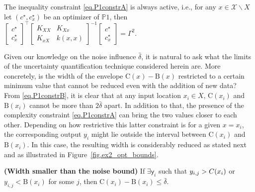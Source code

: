 \begin{proposition} 
	\label{prop.complex_constraint_always_active}
	The inequality constraint \eqref{eq.P1constrA} is always active, i.e., for any $x \in \mathcal{X} \backslash X $ let $(c^\star,c_x^\star)$ be an optimizer of $\mathds{P}1$, then $\begin{bmatrix}
		c ^\star\\
		c_x^\star
	\end{bmatrix}^\top 
	\begin{bmatrix}
		K_{XX} & K_{Xx} \\
		K_{xX} & k(x,x)
	\end{bmatrix}^{-1} 
	\begin{bmatrix}
		c^\star \\
		c_x^\star
	\end{bmatrix} = \Gamma^2 $. 
\end{proposition}

Given our knowledge on the noise influence $\bar \delta$, it is natural to ask what the limits of the uncertainty quantification technique considered herein are. More concretely, is the width of the envelope $\text{C}(x) - \text{B}(x)$ restricted to a certain minimum value that cannot be reduced even with the addition of new data? From \eqref{eq.P1constrB}, it is clear that at any input location $x_i \in X$, $\text{C}(x_i)$ and $\text{B}(x_i)$ cannot be more than $2\bar \delta$ apart. In addition to that, the presence of the complexity constraint \eqref{eq.P1constrA} can bring the two values closer to each other. Depending on how restrictive this latter constraint is for a given $x = x_i$, the corresponding output $y_i$ might lie outside the interval between $\text{C}(x_i)$ and $\text{B}(x_i)$. In this case, the resulting width is considerably reduced as stated next and as illustrated in Figure~\ref{fig.ex2_opt_bounds}.

\begin{proposition} 
	\label{prop.smallWidth}
	{\normalfont \textbf{(Width smaller than the noise bound)}}
	If $\exists \mathsf{y}_i$ such that $y_{i,j} > {\normalfont C}(x_i)$ or $y_{i,j} < \text{B}(x_i)$ for some $j$, then $\text{C}(x_i) - \text{B}(x_i) \leq \bar \delta$.
\end{proposition}

